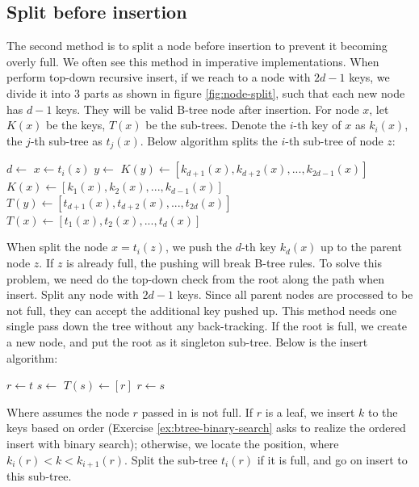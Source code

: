 \documentclass[b5paper]{article}
\begin{document}
\subsection{Split before insertion}

The second method is to split a node before insertion to prevent it becoming overly full. We often see this method in imperative implementations. When perform top-down recursive insert, if we reach to a node with $2d - 1$ keys, we divide it into 3 parts as shown in figure \ref{fig:node-split}, such that each new node has $d - 1$ keys. They will be valid B-tree node after insertion. For node $x$, let $K(x)$ be the keys, $T(x)$ be the sub-trees. Denote the $i$-th key of $x$ as $k_i(x)$, the $j$-th sub-tree as $t_j(x)$. Below algorithm splits the $i$-th sub-tree of node $z$:

\begin{algorithmic}[1]
  \State $d \gets$ 
  \State $x \gets t_i(z)$
  \State $y \gets$ 
  \State $K(y) \gets [k_{d + 1}(x), k_{d + 2}(x), ..., k_{2d - 1}(x)]$
  \State $K(x) \gets [k_1(x), k_2(x), ..., k_{d-1}(x)]$
    \State $T(y) \gets [t_{d + 1}(x), t_{d + 2}(x), ..., t_{2d}(x)]$
    \State $T(x) \gets [t_1(x), t_2(x), ..., t_d(x)]$
  \EndIf
  \State {}
  \State {}
\EndProcedure
\end{algorithmic}

When split the node $x = t_i(z)$, we push the $d$-th key $k_d(x)$ up to the parent node $z$. If $z$ is already full, the pushing will break B-tree rules. To solve this problem, we need do the top-down check from the root along the path when insert. Split any node with $2d - 1$ keys. Since all parent nodes are processed to be not full, they can accept the additional key pushed up. This method needs one single pass down the tree without any back-tracking. If the root is full, we create a new node, and put the root as it singleton sub-tree. Below is the insert algorithm:

\begin{algorithmic}[1]
  \State $r \gets t$
   
    \State $s \gets$ 
    \State $T(s) \gets [ r ]$
    \State {}
    \State $r \gets s$
  \EndIf
  \State \Return {}
\EndFunction
\end{algorithmic}

Where  assumes the node $r$ passed in
is not full. If $r$ is a leaf, we insert $k$ to the keys based on order (Exercise \ref{ex:btree-binary-search} asks to realize the ordered insert with binary search); otherwise, we locate the position, where $k_i(r) < k < k_{i+1}(r)$. Split the sub-tree $t_i(r)$ if it is full, and go on insert to this sub-tree.
\end{document}
